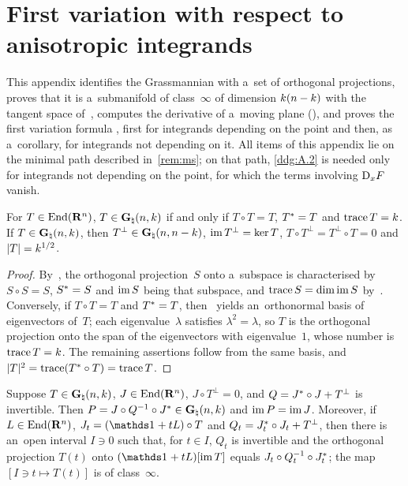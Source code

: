 \documentclass[a4paper,twoside,leqno]{article}
\newcommand{\Gk}{\pgrass{\adim}{\vdim}}        %
\newcommand{\MS}{\textbf{[MS path]}}            %
\begin{document}
\appendix

\section{First variation with respect to anisotropic integrands}
\label{sec:A}

\begin{miniremark}
    \label{mr:A}
    This appendix identifies the Grassmannian with a~set of orthogonal projections, proves that
    it is a~submanifold of class~$\infty$ of dimension $k(n - k)$ with the tangent
    space of~\cite[Appendix~A]{DePhilippis2018}, computes the derivative of a~moving plane
    (\cite[Lemma~A.1]{DePhilippis2018}), and proves the first variation formula
    \cite[Lemma~A.2]{DePhilippis2018}, first for integrands depending on the point and then, as
    a~corollary, for integrands not depending on it. All items of this appendix lie on the
    minimal path described in~\ref{rem:ms}; on that path, \ref{ddg:A.2} is needed only for
    integrands not depending on the point, for which the terms involving $\mathrm{D}_x F$ vanish.
\end{miniremark}

\begin{lemma}[{\cite[(A.1)]{DePhilippis2018}; \MS}]
    \label{ddg:A.1}
    For $T \in \mathrm{End}({\mathbf{R}^{n}})$, $T \in \Gk$ if and only if $T \circ T = T$, $T^{*} = T$ and
    $\operatorname{trace} T = k$. If $T \in \Gk$, then $T^\perp \in \mathbf{G}_{\natural}(n,n - k)$, $\operatorname{im}
    T^\perp = \ker T$, $T \circ T^\perp = T^\perp \circ T = 0$ and $|T| = k^{1/2}$.
\end{lemma}

\begin{proof}
    By~\cite[2.3]{Allard1972}, the orthogonal projection~$S$ onto a~subspace is characterised by
    $S \circ S = S$, $S^{*} = S$ and $\operatorname{im} S$ being that subspace, and $\operatorname{trace} S = \dim \operatorname{im}
    S$ by~\cite[2.3(3)]{Allard1972}. Conversely, if $T \circ T = T$ and $T^{*} = T$,
    then~\cite[1.7.3]{Federer1969} yields an~orthonormal basis of eigenvectors of~$T$; each
    eigenvalue~$\lambda$ satisfies $\lambda^2 = \lambda$, so $T$ is the orthogonal projection onto
    the span of the eigenvectors with eigenvalue~$1$, whose number is $\operatorname{trace} T = k$. The
    remaining assertions follow from the same basis, and $|T|^2 = \operatorname{trace}(T^{*} \circ T) =
    \operatorname{trace} T$.
\end{proof}

\begin{lemma}[new; \MS]
    \label{new:projformula}
    Suppose $T \in \Gk$, $J \in \mathrm{End}({\mathbf{R}^{n}})$, $J \circ T^\perp = 0$, and $Q = J^{*}
    \circ J + T^\perp$ is invertible. Then $P = J \circ Q^{-1} \circ \transpose{J} \in \Gk$ and $\operatorname{im}
    P = \operatorname{im} J$. Moreover, if $L \in \mathrm{End}({\mathbf{R}^{n}})$, $J_t = (\id{} + tL) \circ T$ and $Q_t =
    J_t^{*} \circ J_t + T^\perp$, then there is an~open interval $I \ni 0$ such that, for $t
    \in I$, $Q_t$ is invertible and the orthogonal projection $T(t)$ onto $(\id{} + tL)[\im T]$
    equals $J_t \circ Q_t^{-1} \circ J_t^{*}$; the map $[ I \ni t \mapsto T(t) ]$ is of
    class~$\infty$.
\end{lemma}
\end{document}
